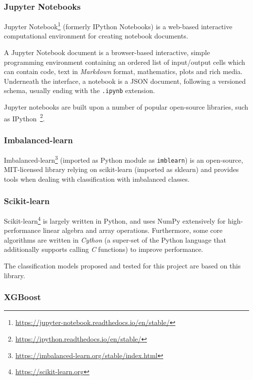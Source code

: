 \documentclass[a4paper, 12pt]{book}
\begin{document}
\subsubsection{Jupyter Notebooks}
\label{sssec:jupyter-notebooks}

Jupyter Notebook\footnote{\url{https://jupyter-notebook.readthedocs.io/en/stable/}} (formerly IPython Notebooks) is a web-based interactive computational environment for creating notebook documents.

A Jupyter Notebook document is a browser-based interactive, simple programming environment containing an ordered list of input/output cells which can contain code, text in \emph{Markdown} format, mathematics, plots and rich media. Underneath the interface, a notebook is a JSON document, following a versioned schema, usually ending with the \texttt{.ipynb} extension.

Jupyter notebooks are built upon a number of popular open-source libraries, such as IPython~\footnote{\url{https://ipython.readthedocs.io/en/stable/}}.

\subsubsection{Imbalanced-learn}
\label{sssec:imblearn}

Imbalanced-learn\footnote{\url{https://imbalanced-learn.org/stable/index.html}} (imported as Python module as \texttt{imblearn}) is an open-source, MIT-licensed library relying on scikit-learn (imported as sklearn) and provides tools when dealing with classification with imbalanced classes.

\subsubsection{Scikit-learn}
\label{sssec:scikit-learn}

Scikit-learn\footnote{\url{https://scikit-learn.org}} is largely written in Python, and uses NumPy extensively for high-performance linear algebra and array operations. Furthermore, some core algorithms are written in \emph{Cython} (a super-set of the Python language that additionally supports calling \emph{C} functions) to improve performance.

The classification models proposed and tested for this project are based on this library. 

\subsubsection{XGBoost}
\label{sssec:state-art-xgboost}
\end{document}
